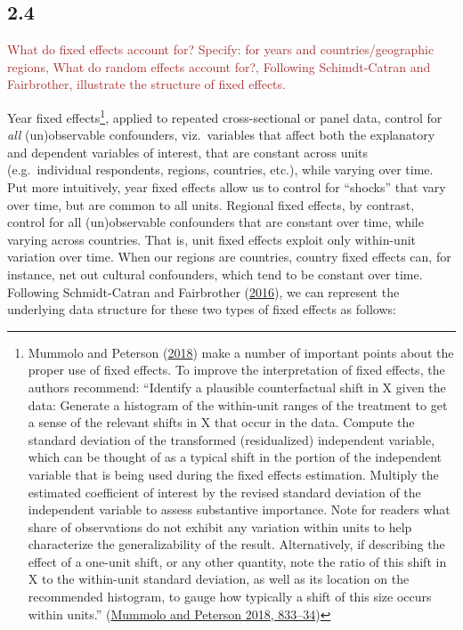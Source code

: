\documentclass[
]{article}
\begin{document}
\hypertarget{section-8}{%
\subsection{2.4}\label{section-8}}

\textcolor{brown}{What do fixed effects account for? Specify: for years and countries/geographic regions, What do random effects account for?, Following Schimdt-Catran and Fairbrother, illustrate the structure of fixed effects.}

Year fixed effects\footnote{Mummolo and Peterson
  (\protect\hyperlink{ref-mummolo2018improving}{2018}) make a number of
  important points about the proper use of fixed effects. To improve the
  interpretation of fixed effects, the authors recommend: ``Identify a
  plausible counterfactual shift in X given the data: Generate a
  histogram of the within-unit ranges of the treatment to get a sense of
  the relevant shifts in X that occur in the data. Compute the standard
  deviation of the transformed (residualized) independent variable,
  which can be thought of as a typical shift in the portion of the
  independent variable that is being used during the fixed effects
  estimation. Multiply the estimated coefficient of interest by the
  revised standard deviation of the independent variable to assess
  substantive importance. Note for readers what share of observations do
  not exhibit any variation within units to help characterize the
  generalizability of the result. Alternatively, if describing the
  effect of a one-unit shift, or any other quantity, note the ratio of
  this shift in X to the within-unit standard deviation, as well as its
  location on the recommended histogram, to gauge how typically a shift
  of this size occurs within units.''
  (\protect\hyperlink{ref-mummolo2018improving}{Mummolo and Peterson
  2018, 833--34})}, applied to repeated cross-sectional or panel data,
control for \emph{all} (un)observable confounders, viz.~variables that
affect both the explanatory and dependent variables of interest, that
are constant across units (e.g.~individual respondents, regions,
countries, etc.), while varying over time. Put more intuitively, year
fixed effects allow us to control for ``shocks'' that vary over time,
but are common to all units. Regional fixed effects, by contrast,
control for all (un)observable confounders that are constant over time,
while varying across countries. That is, unit fixed effects exploit only
within-unit variation over time. When our regions are countries, country
fixed effects can, for instance, net out cultural confounders, which
tend to be constant over time. Following Schmidt-Catran and Fairbrother
(\protect\hyperlink{ref-schmidt2016random}{2016}), we can represent the
underlying data structure for these two types of fixed effects as
follows:
\end{document}
